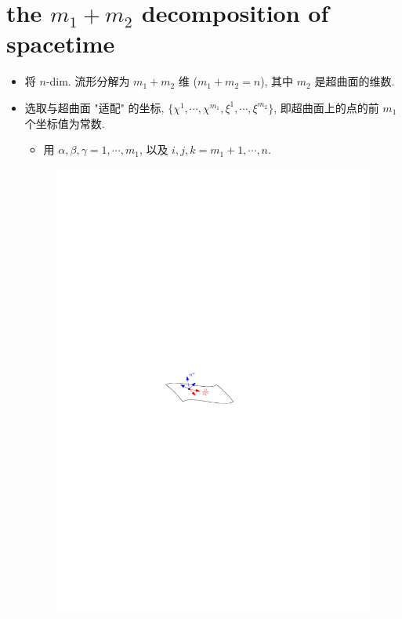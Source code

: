\chapter{the \texorpdfstring{$m_1 + m_2$}{m1 + m2} decomposition of spacetime}
\begin{itemize}
	\item 将 $n$-dim. 流形分解为 $m_1 + m_2$ 维 ($m_1 + m_2 = n$), 其中 $m_2$ 是超曲面的维数.
	
	\item 选取与超曲面 "适配" 的坐标, $\{\chi^1, \cdots, \chi^{m_1}, \xi^1, \cdots, \xi^{m_2}\}$, 即超曲面上的点的前 $m_1$ 个坐标值为常数.
	\begin{itemize}
		\item 用 $\alpha, \beta, \gamma = 1, \cdots, m_1$, 以及 $i, j, k = m_1 + 1, \cdots, n$.
	\end{itemize}
	
	\begin{figure}[H]
		\centering
		\includegraphics[scale=1]{figures/the m1 + m2 decomposition of spacetime.pdf}
	\end{figure}
\end{itemize}

